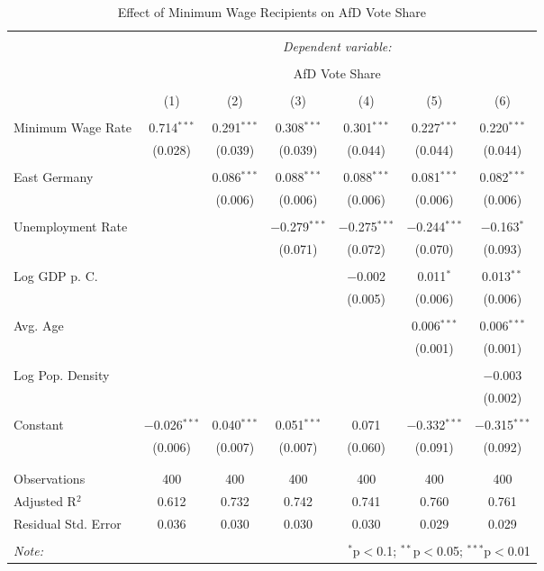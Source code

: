 
\begin{table}[!htbp] \centering 
  \caption{Effect of Minimum Wage Recipients on AfD Vote Share} 
  \label{} 
\begin{tabular}{@{\extracolsep{5pt}}lcccccc} 
\\[-1.8ex]\hline 
\hline \\[-1.8ex] 
 & \multicolumn{6}{c}{\textit{Dependent variable:}} \\ 
\cline{2-7} 
\\[-1.8ex] & \multicolumn{6}{c}{AfD Vote Share} \\ 
\\[-1.8ex] & (1) & (2) & (3) & (4) & (5) & (6)\\ 
\hline \\[-1.8ex] 
 Minimum Wage Rate & 0.714$^{***}$ & 0.291$^{***}$ & 0.308$^{***}$ & 0.301$^{***}$ & 0.227$^{***}$ & 0.220$^{***}$ \\ 
  & (0.028) & (0.039) & (0.039) & (0.044) & (0.044) & (0.044) \\ 
  & & & & & & \\ 
 East Germany &  & 0.086$^{***}$ & 0.088$^{***}$ & 0.088$^{***}$ & 0.081$^{***}$ & 0.082$^{***}$ \\ 
  &  & (0.006) & (0.006) & (0.006) & (0.006) & (0.006) \\ 
  & & & & & & \\ 
 Unemployment Rate &  &  & $-$0.279$^{***}$ & $-$0.275$^{***}$ & $-$0.244$^{***}$ & $-$0.163$^{*}$ \\ 
  &  &  & (0.071) & (0.072) & (0.070) & (0.093) \\ 
  & & & & & & \\ 
 Log GDP p. C. &  &  &  & $-$0.002 & 0.011$^{*}$ & 0.013$^{**}$ \\ 
  &  &  &  & (0.005) & (0.006) & (0.006) \\ 
  & & & & & & \\ 
 Avg. Age &  &  &  &  & 0.006$^{***}$ & 0.006$^{***}$ \\ 
  &  &  &  &  & (0.001) & (0.001) \\ 
  & & & & & & \\ 
 Log Pop. Density &  &  &  &  &  & $-$0.003 \\ 
  &  &  &  &  &  & (0.002) \\ 
  & & & & & & \\ 
 Constant & $-$0.026$^{***}$ & 0.040$^{***}$ & 0.051$^{***}$ & 0.071 & $-$0.332$^{***}$ & $-$0.315$^{***}$ \\ 
  & (0.006) & (0.007) & (0.007) & (0.060) & (0.091) & (0.092) \\ 
  & & & & & & \\ 
\hline \\[-1.8ex] 
Observations & 400 & 400 & 400 & 400 & 400 & 400 \\ 
Adjusted R$^{2}$ & 0.612 & 0.732 & 0.742 & 0.741 & 0.760 & 0.761 \\ 
Residual Std. Error & 0.036 & 0.030 & 0.030 & 0.030 & 0.029 & 0.029 \\ 
\hline 
\hline \\[-1.8ex] 
\textit{Note:}  & \multicolumn{6}{r}{$^{*}$p$<$0.1; $^{**}$p$<$0.05; $^{***}$p$<$0.01} \\ 
\end{tabular} 
\end{table} 
